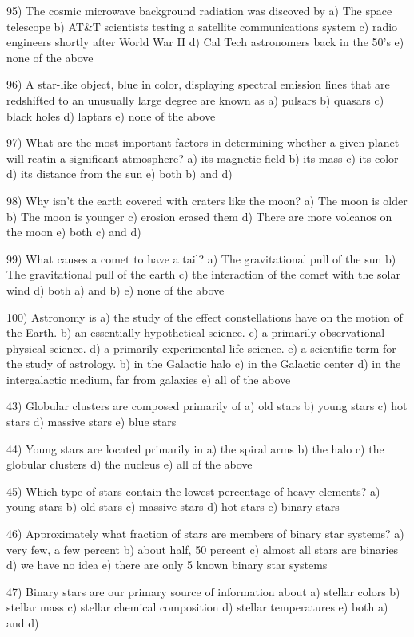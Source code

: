 95) The cosmic microwave background radiation was discoved by
a) The space telescope
b) AT&T scientists testing a satellite communications system
c) radio engineers shortly after World War II
d) Cal Tech astronomers back in the 50's
e) none of the above

96) A star-like object, blue in color, displaying spectral emission lines
that are redshifted to an unusually large degree are known as
a) pulsars b) quasars c) black holes d) laptars e) none of the above

97) What are the most important factors in determining whether a given planet
will reatin a significant atmosphere?
a) its magnetic field
b) its mass
c) its color
d) its distance from the sun
e) both b) and d)

98) Why isn't the earth covered with craters like the moon?
a) The moon is older
b) The moon is younger
c) erosion erased them
d) There are more volcanos on the moon
e) both c) and d)

99) What causes a comet to have a tail?
a) The gravitational pull of the sun
b) The gravitational pull of the earth
c) the interaction of the comet with the solar wind
d) both a) and b)
e) none of the above

100) Astronomy is
a) the study of the effect constellations have on the motion of the Earth.
b) an essentially hypothetical science.
c) a primarily observational physical science.
d) a primarily experimental life science.
e) a scientific term for the study of astrology.
b) in the Galactic halo
c) in the Galactic center
d) in the intergalactic medium, far from galaxies
e) all of the above

43) Globular clusters are composed primarily of
a) old stars b) young stars c) hot stars d) massive stars e) blue stars

44) Young stars are located primarily in
a) the spiral arms b) the halo c) the globular clusters
d) the nucleus e) all of the above

45) Which type of stars contain the lowest percentage of heavy elements?
a) young stars b) old stars c) massive stars d) hot stars e) binary stars

46) Approximately what fraction of stars are members of binary star systems?
a) very few, a few percent b) about half, 50 percent
c) almost all stars are binaries d) we have no idea
e) there are only 5 known binary star systems

47) Binary stars are our primary source of information about
a) stellar colors b) stellar mass c) stellar chemical composition
d) stellar temperatures e) both a) and d)

